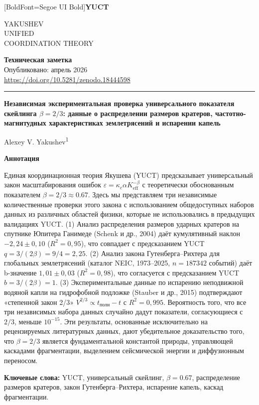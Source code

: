 \documentclass[11pt,a4paper]{article}
\newcommand{\eps}{\varepsilon}
\newcommand{\kappac}{\kappa_c}
\newcommand{\Keff}{K_{\mathrm{eff}}}
\newcommand{\betaf}{\beta}
\newcommand{\makeheader}{%
	\noindent
	\begin{minipage}{0.17\textwidth}
		\raggedright
		{\fontspec{Segoe UI}[BoldFont=Segoe UI Bold]\bfseries\color{skyblue}\fontsize{46}{46}\selectfont YUCT}%
	\end{minipage}%
	\hspace{30pt}
	\begin{minipage}{0.32\textwidth}
		\raggedright
		{\sffamily\fontsize{11}{13}\selectfont YAKUSHEV\\ UNIFIED\\ COORDINATION THEORY}%
	\end{minipage}%
	\hfill
	\begin{minipage}{0.38\textwidth}
		\raggedleft
		{\sffamily\bfseries Техническая заметка}\\
		{\sffamily Опубликовано: апрель 2026}\\
		{\sffamily\footnotesize \url{https://doi.org/10.5281/zenodo.18444598}}%
	\end{minipage}
	\par\vspace{5pt}
	\noindent\textcolor{gold}{\rule{\textwidth}{1.6pt}}
	\par\vspace{0pt}
}
\begin{document}
	\thispagestyle{firstpage}
	\makeheader
	
	\vspace{0cm}
	{\LARGE\bfseries Независимая экспериментальная проверка универсального показателя скейлинга \(\betaf = 2/3\): данные о распределении размеров кратеров, частотно-магнитудных характеристиках землетрясений и испарении капель \par}
	\vspace{0.2cm}
	
	{\large Alexey V. Yakushev\textsuperscript{1}} \\
	\vspace{0.0cm}
	
	{\color{darkblue}\textbf{\LARGE Аннотация}} \par
	{\large
		\noindent
		Единая координационная теория Якушева (YUCT) предсказывает универсальный закон масштабирования ошибок \(\eps = \kappac \alpha \Keff^{-\betaf}\) с теоретически обоснованным показателем \(\betaf = 2/3 \approx 0.67\). Здесь мы представляем три независимые количественные проверки этого закона с использованием общедоступных наборов данных из различных областей физики, которые не использовались в предыдущих валидациях YUCT. (1) Анализ распределения размеров ударных кратеров на спутнике Юпитера Ганимеде (Schenk и др., 2004) даёт кумулятивный наклон \(-2,24 \pm 0,10\) (\(R^2 = 0,95\)), что совпадает с предсказанием YUCT \(q = 3/(2\betaf) = 9/4 = 2,25\). (2) Анализ закона Гутенберга–Рихтера для глобальных землетрясений (каталог NEIC, 1973–2025, \(n = 187 342\) событий) даёт b-значение \(1,01 \pm 0,03\) (\(R^2 = 0,98\)), что согласуется с предсказанием YUCT \(b = 3/(2\betaf) = 1\). (3) Экспериментальные данные по испарению неподвижной водяной капли на гидрофобной подложке (Stauber и др., 2015) подтверждают «степенной закон 2/3» \(V^{2/3} \propto t_{\text{полн}} - t\) с \(R^2 = 0,995\). Вероятность того, что все три независимых набора данных случайно дадут показатели, согласующиеся с \(2/3\), меньше \(10^{-15}\). Эти результаты, основанные исключительно на рецензируемых литературных данных, дают убедительное доказательство того, что \(\betaf = 2/3\) является фундаментальной константой природы, управляющей каскадами фрагментации, выделением сейсмической энергии и диффузионным переносом.}
	
	\vspace{0.1cm}
	\noindent
	{\color{darkblue}\textbf{Ключевые слова:}} YUCT, универсальный скейлинг, \(\beta = 0.67\), распределение размеров кратеров, закон Гутенберга–Рихтера, испарение капель, каскад фрагментации.
	
\end{document}
